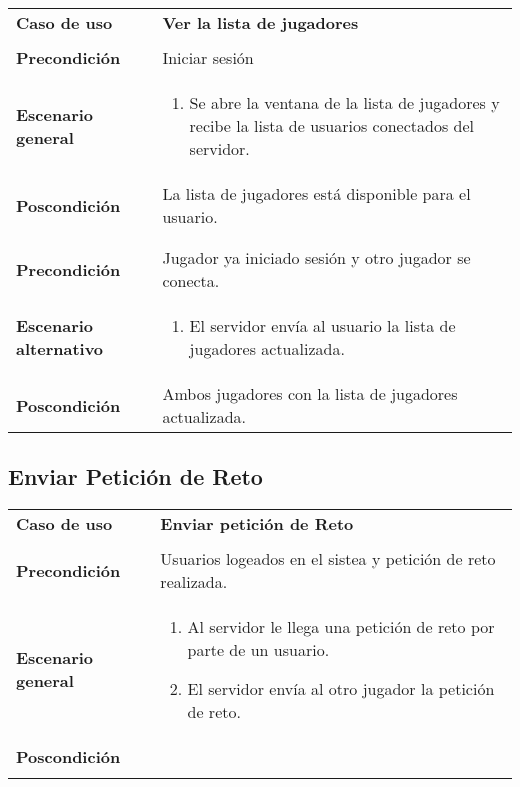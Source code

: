 {\footnotesize
\begin{tabularx}{0.95\textwidth}{p{}|X}

\textbf{Caso de uso} & \textbf{Ver la lista de jugadores} \\
& \\
\textbf{Precondición} & Iniciar sesión \\

\textbf{Escenario general} & \begin{enumerate}
\item Se abre la ventana de la lista de jugadores y recibe la lista de
usuarios conectados del servidor.

\end{enumerate} \\

\textbf{Poscondición} & La lista de jugadores está disponible para el usuario.\\
 & \\
& \\
\textbf{Precondición} & Jugador ya iniciado sesión y otro jugador se conecta.\\
\textbf{Escenario alternativo} & \begin{enumerate}
\item El servidor envía al usuario la lista de jugadores actualizada.
\end{enumerate}\\
\textbf{Poscondición}& Ambos jugadores con la lista de jugadores actualizada.\\
\end{tabularx}
}


\subsection{Enviar Petición de Reto}

{\footnotesize
\begin{tabularx}{0.95\textwidth}{p{}|X}

\textbf{Caso de uso} & \textbf{Enviar petición de Reto}\\
& \\
\textbf{Precondición} & Usuarios logeados en el sistea y petición de reto realizada. \\

\textbf{Escenario general} & \begin{enumerate}

\item Al servidor le llega una petición de reto por parte de un usuario.
\item El servidor envía al otro jugador la petición de reto.

\end{enumerate} \\

\textbf{Poscondición} &  \\ \\

\end{tabularx}
}

